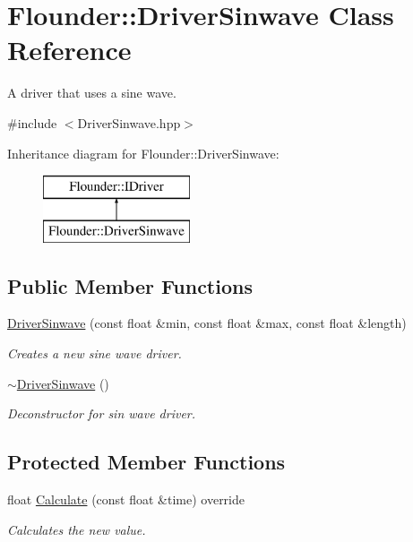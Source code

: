 \hypertarget{class_flounder_1_1_driver_sinwave}{}\section{Flounder\+:\+:Driver\+Sinwave Class Reference}
\label{class_flounder_1_1_driver_sinwave}


A driver that uses a sine wave.  




{\ttfamily \#include $<$Driver\+Sinwave.\+hpp$>$}

Inheritance diagram for Flounder\+:\+:Driver\+Sinwave\+:\begin{figure}[H]
\begin{center}
\leavevmode
\includegraphics[height=2.000000cm]{class_flounder_1_1_driver_sinwave}
\end{center}
\end{figure}
\subsection*{Public Member Functions}
\begin{DoxyCompactItemize}
\item 
\hyperlink{class_flounder_1_1_driver_sinwave_a191493a90d30cf7d04d0ea3dc38e24e7}{Driver\+Sinwave} (const float \&min, const float \&max, const float \&length)
\begin{DoxyCompactList}\small\item\em Creates a new sine wave driver. \end{DoxyCompactList}\item 
\hyperlink{class_flounder_1_1_driver_sinwave_a8067ff41164e9b4b579b772d7adb7a02}{$\sim$\+Driver\+Sinwave} ()
\begin{DoxyCompactList}\small\item\em Deconstructor for sin wave driver. \end{DoxyCompactList}\end{DoxyCompactItemize}
\subsection*{Protected Member Functions}
\begin{DoxyCompactItemize}
\item 
float \hyperlink{class_flounder_1_1_driver_sinwave_acb475a9bad5c9ae3d67ff3e74ce8bbb9}{Calculate} (const float \&time) override
\begin{DoxyCompactList}\small\item\em Calculates the new value. \end{DoxyCompactList}\end{DoxyCompactItemize}
